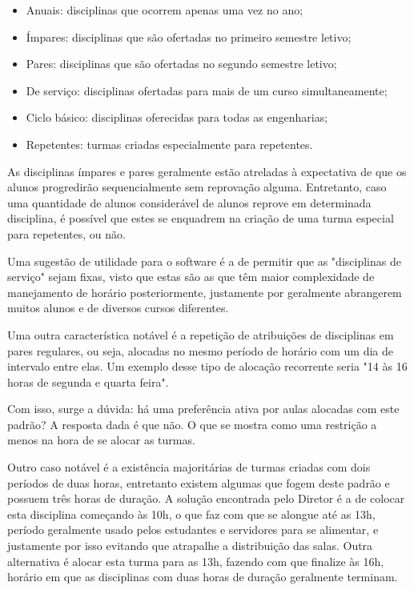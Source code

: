 \begin{itemize}
    \item Anuais: disciplinas que ocorrem apenas uma vez no ano;
    \item Ímpares: disciplinas que são ofertadas no primeiro semestre letivo;
    \item Pares: disciplinas que são ofertadas no segundo semestre letivo;
    \item De serviço: disciplinas ofertadas para mais de um curso simultaneamente;
    \item Ciclo básico: disciplinas oferecidas para todas as engenharias;
    \item Repetentes: turmas criadas especialmente para repetentes.
\end{itemize}


As disciplinas ímpares e pares geralmente estão atreladas à expectativa de que os alunos progredirão sequencialmente sem reprovação alguma. Entretanto, caso uma quantidade de alunos considerável de alunos reprove em determinada disciplina, é possível que estes se enquadrem na criação de uma turma especial para repetentes, ou não.

Uma sugestão de utilidade para o software é a de permitir que as "disciplinas de serviço" sejam fixas, visto que estas são as que têm maior complexidade de manejamento de horário posteriormente, justamente por geralmente abrangerem muitos alunos e de diversos cursos diferentes.

Uma outra característica notável é a repetição de atribuições de disciplinas em pares regulares, ou seja, alocadas no mesmo período de horário com um dia de intervalo entre elas. Um exemplo desse tipo de alocação recorrente seria "14 às 16 horas de segunda e quarta feira".

Com isso, surge a dúvida: há uma preferência ativa por aulas alocadas com este padrão? A resposta dada é que não. O que se mostra como uma restrição a menos na hora de se alocar as turmas.

Outro caso notável é a existência majoritárias de turmas criadas com dois períodos de duas horas, entretanto existem algumas que fogem deste padrão e possuem três horas de duração. A solução encontrada pelo Diretor é a de colocar esta disciplina começando às 10h, o que faz com que se alongue até as 13h, período geralmente usado pelos estudantes e servidores para se alimentar, e justamente por isso evitando que atrapalhe a distribuição das salas. Outra alternativa é alocar esta turma para as 13h, fazendo com que finalize às 16h, horário em que as disciplinas com duas horas de duração geralmente terminam.

